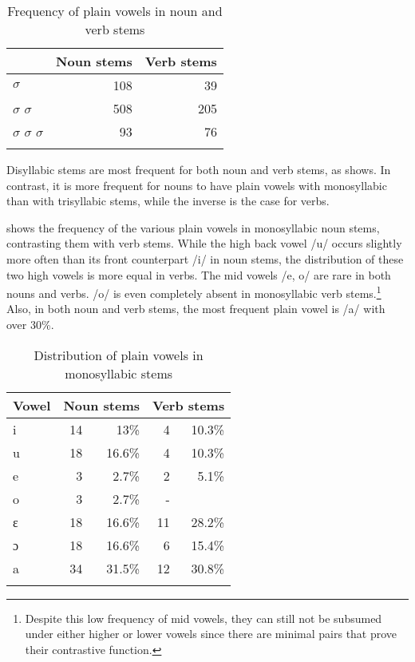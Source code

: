 \begin{table}
\begin{tabular}{lrr}
\lsptoprule
& Noun stems &   Verb stems \\  \midrule
$\sigma$    & 108  &    39 \\
$\sigma$ $\sigma$  & 508 & 205 \\
$\sigma$ $\sigma$ $\sigma$ & 93 &  76 \\
\lspbottomrule
\end{tabular}
\caption{Frequency of plain vowels in noun and verb stems}
\label{Tab:CardV}
\end{table}

\newpage
Disyllabic stems are most frequent for both noun and verb stems, as  shows. In contrast, it is more frequent for nouns to have plain vowels with monosyllabic than with trisyllabic stems, while the inverse is the case for verbs.

 shows the frequency of the various plain vowels in monosyllabic noun stems, contrasting them with verb stems. While the high back vowel /u/ occurs slightly more often than its front counterpart /i/ in noun stems, the distribution of these two high vowels is more equal in verbs. The mid vowels /e, o/ are rare in both nouns and verbs. /o/ is even completely absent in monosyllabic verb stems.\footnote{Despite this low frequency of mid vowels, they can still not be subsumed under either higher or lower vowels since there are minimal pairs that prove their contrastive function.} Also, in both noun and verb stems, the most frequent plain vowel is /a/ with over 30\%.

\begin{table}
\begin{tabular}{l rrrr}
\lsptoprule
Vowel & \multicolumn{2}{c}{Noun stems} & \multicolumn{2}{c}{Verb stems} \\
\midrule
i &  	14 & 13\%   &  4& 10.3\% \\
u & 	18 & 16.6\% & 4 & 10.3\% \\
e & 	3  & 2.7\%  &  2& 5.1\% \\
o & 	3  & 2.7\%  & - &  \\
ɛ &  	18 & 16.6\% & 11& 28.2\% \\
ɔ & 	18 & 16.6\% & 6 & 15.4\% \\
a  & 	34 & 31.5\% & 12& 30.8\% \\
\lspbottomrule
\end{tabular}
\caption{Distribution of plain vowels in monosyllabic stems}
\label{Tab:MonoV}
\end{table}

